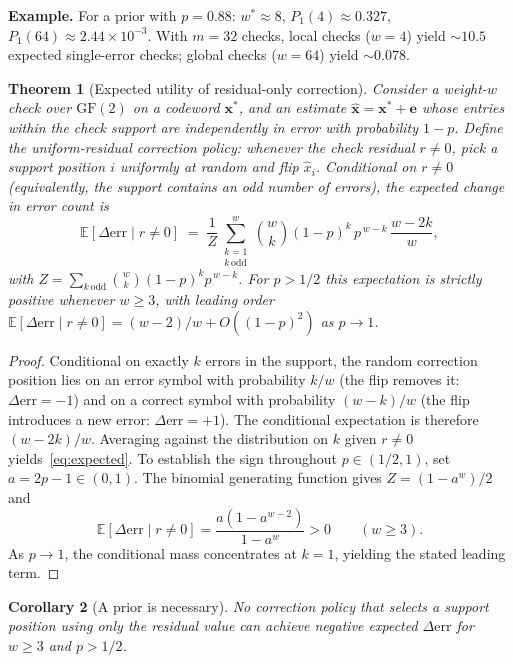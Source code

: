 \documentclass[11pt,a4paper]{article}
\newtheorem{theorem}{Theorem}
\newtheorem{corollary}[theorem]{Corollary}
\begin{document}
\smallskip\noindent\textbf{Example.} For a prior with
$p = 0.88$: $w^* \approx 8$, $P_1(4) \approx 0.327$,
$P_1(64) \approx 2.44 \times 10^{-3}$. With $m = 32$ checks,
local checks ($w{=}4$) yield ${\sim}10.5$ expected single-error checks;
global checks ($w{=}64$) yield ${\sim}0.078$.

\begin{theorem}[Expected utility of residual-only correction]\label{thm:expected}
Consider a weight-$w$ check over $\mathrm{GF}(2)$ on a codeword
$\mathbf{x}^*$, and an estimate
$\hat{\mathbf{x}} = \mathbf{x}^* + \mathbf{e}$ whose entries within the
check support are independently in error with probability $1-p$.
Define the \emph{uniform-residual correction policy}: whenever the
check residual $r \neq 0$, pick a support position $i$ uniformly at
random and flip $\hat{x}_i$. Conditional on $r \neq 0$ (equivalently,
the support contains an odd number of errors), the expected change in
error count is
\begin{equation}\label{eq:expected}
  \mathbb{E}[\Delta\mathrm{err}\mid r\neq 0]
  \;=\; \frac{1}{Z}\!\sum_{\substack{k=1\\ k\,\mathrm{odd}}}^{w}
  \binom{w}{k}(1-p)^{k}\,p^{\,w-k}\,\frac{w-2k}{w},
\end{equation}
with $Z = \sum_{k\,\mathrm{odd}}\binom{w}{k}(1-p)^k p^{\,w-k}$. For
$p > 1/2$ this expectation is strictly positive whenever $w \geq 3$,
with leading order
$\mathbb{E}[\Delta\mathrm{err}\mid r\neq 0] = (w-2)/w + O((1-p)^{2})$
as $p \to 1$.
\end{theorem}

\begin{proof}
Conditional on exactly $k$ errors in the support, the random
correction position lies on an error symbol with probability $k/w$
(the flip removes it: $\Delta\mathrm{err} = -1$) and on a correct
symbol with probability $(w-k)/w$ (the flip introduces a new error:
$\Delta\mathrm{err} = +1$). The conditional expectation is therefore
$(w-2k)/w$. Averaging against the distribution on $k$ given $r \neq 0$
yields~\eqref{eq:expected}. To establish the sign throughout
$p\in(1/2,1)$, set $a=2p-1\in(0,1)$. The binomial generating
function gives $Z=(1-a^w)/2$ and
\[
 \mathbb{E}[\Delta\mathrm{err}\mid r\ne0]
 =\frac{a(1-a^{w-2})}{1-a^w}>0\qquad(w\ge3).
\]
As $p\to1$, the conditional mass concentrates at $k=1$, yielding
the stated leading term.
\end{proof}

\begin{corollary}[A prior is necessary]\label{cor:prior}
No correction policy that selects a support position using only the
residual value can achieve negative expected $\Delta\mathrm{err}$ for
$w \geq 3$ and $p > 1/2$.
\end{corollary}
\end{document}
